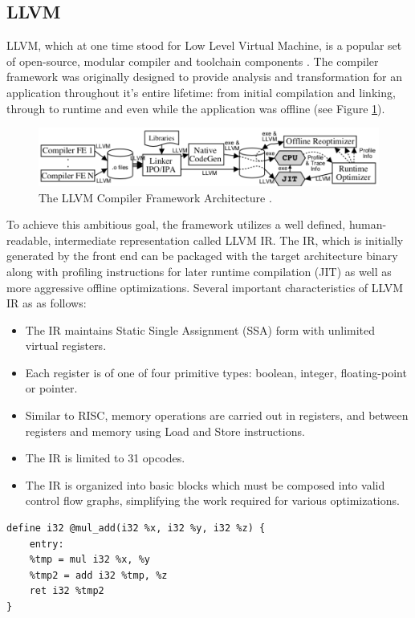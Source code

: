 \subsection{LLVM}
\label{sec:llvm}
LLVM, which at one time stood for Low Level Virtual Machine, is a popular set of open-source, modular compiler and toolchain components \cite{lattner2004llvm}.
The compiler framework was originally designed to provide analysis and transformation for an application throughout it's entire lifetime: from initial compilation and linking, through to runtime and even while the application was offline (see Figure \ref{fig:llvmarch}).
\begin{figure}
    \includegraphics[width=\textwidth]{images/llvm-architecture.png}
    \caption{ The LLVM Compiler Framework Architecture \cite{lattner2004llvm}.}
    \label{fig:llvmarch}
    \Description[]{}
\end{figure}
To achieve this ambitious goal, the framework utilizes a well defined, human-readable, intermediate representation called LLVM IR.
The IR, which is initially generated by the front end can be packaged with the target architecture binary along with profiling instructions for later runtime compilation (JIT) as well as more aggressive offline optimizations.
Several important characteristics of LLVM IR as as follows:
\begin{itemize}
    \item The IR maintains Static Single Assignment (SSA) form with unlimited virtual registers.
    \item Each register is of one of four primitive types: boolean, integer, floating-point or pointer.
    \item Similar to RISC, memory operations are carried out in registers, and between registers and memory using Load and Store instructions.
    \item The IR is limited to 31 opcodes.
    \item The IR is organized into basic blocks which must be composed into valid control flow graphs, simplifying the work required for various optimizations. 
\end{itemize}

\begin{lstlisting}[float,floatplacement=H,
caption={LLVM IR for a function multiplying x * y and adding z \cite{LLVM_Jit_Tutorial}.},
label=lst:llvm_ir]
define i32 @mul_add(i32 %x, i32 %y, i32 %z) {
    entry:
    %tmp = mul i32 %x, %y
    %tmp2 = add i32 %tmp, %z
    ret i32 %tmp2
}\end{lstlisting}


